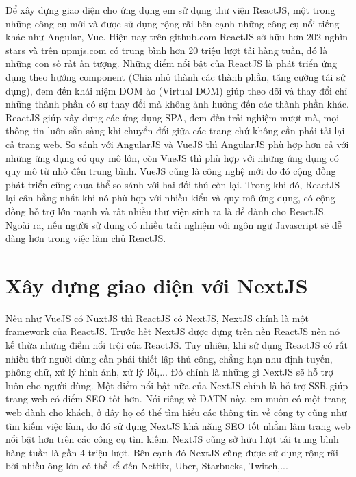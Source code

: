 \documentclass[../DoAn.tex]{subfiles}
\begin{document}
Để xây dựng giao diện cho ứng dụng em sử dụng thư viện ReactJS, một trong những công cụ mới và được sử dụng rộng rãi bên cạnh những công cụ nổi tiếng khác như Angular, Vue. Hiện nay trên github.com ReactJS sở hữu hơn 202 nghìn stars và trên npmjs.com có trung bình hơn 20 triệu lượt tải hàng tuần, đó là những con số rất ấn tượng. Những điểm nổi bật của ReactJS là phát triển ứng dụng theo hướng component (Chia nhỏ thành các thành phần, tăng cường tái sử dụng), đem đến khái niệm DOM ảo (Virtual DOM) giúp theo dõi và thay đổi chỉ những thành phần có sự thay đổi mà không ảnh hưởng đến các thành phần khác. ReactJS giúp xây dựng các ứng dụng SPA, đem đến trải nghiệm mượt mà, mọi thông tin luôn sẵn sàng khi chuyển đổi giữa các trang chứ không cần phải tải lại cả trang web. So sánh với AngularJS và VueJS thì AngularJS phù hợp hơn cả với những ứng dụng có quy mô lớn, còn VueJS thì phù hợp với những ứng dụng có quy mô từ nhỏ đến trung bình. VueJS cũng là công nghệ mới do đó cộng đồng phát triển cũng chưa thể so sánh với hai đối thủ còn lại. Trong khi đó, ReactJS lại cân bằng nhất khi nó phù hợp với nhiều kiểu và quy mô ứng dụng, có cộng đồng hỗ trợ lớn mạnh và rất nhiều thư viện sinh ra là để dành cho ReactJS. Ngoài ra, nếu người sử dụng có nhiều trải nghiệm với ngôn ngữ Javascript sẽ dễ dàng hơn trong việc làm chủ ReactJS.
\hfill

\section{Xây dựng giao diện với NextJS\cite{NextJS}}
Nếu như VueJS có NuxtJS thì ReactJS có NextJS, NextJS chính là một framework của ReactJS. Trước hết NextJS được dựng trên nền ReactJS nên nó kế thừa những điểm nổi trội của ReactJS. Tuy nhiên, khi sử dụng ReactJS có rất nhiều thứ người dùng cần phải thiết lập thủ công, chẳng hạn như định tuyến, phông chữ, xử lý hình ảnh, xử lý lỗi,... Đó chính là những gì NextJS sẽ hỗ trợ luôn cho người dùng. Một điểm nổi bật nữa của NextJS chính là hỗ trợ SSR giúp trang web có điểm SEO tốt hơn. Nói riêng về DATN này, em muốn có một trang web dành cho khách, ở đây họ có thể tìm hiểu các thông tin về công ty cũng như tìm kiếm việc làm, do đó sử dụng NextJS khả năng SEO tốt nhằm làm trang web nổi bật hơn trên các công cụ tìm kiếm. NextJS cũng sở hữu lượt tải trung bình hàng tuần là gần 4 triệu lượt. Bên cạnh đó NextJS cũng được sử dụng rộng rãi bởi nhiều ông lớn có thể kể đến Netflix, Uber, Starbucks, Twitch,...
\end{document}
